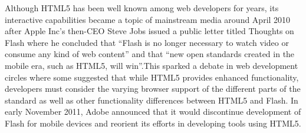 Although HTML5 has been well known among web developers for years, its interactive capabilities became a topic of mainstream media around April 2010 after Apple Inc's then-CEO Steve Jobs issued a public letter titled Thoughts on Flash where he concluded that ``Flash is no longer necessary to watch video or consume any kind of web content'' and that ``new open standards created in the mobile era, such as HTML5, will win''.This sparked a debate in web development circles where some suggested that while HTML5 provides enhanced functionality, developers must consider the varying browser support of the different parts of the standard as well as other functionality differences between HTML5 and Flash. In early November 2011, Adobe announced that it would discontinue development of Flash for mobile devices and reorient its efforts in developing tools using HTML5.
